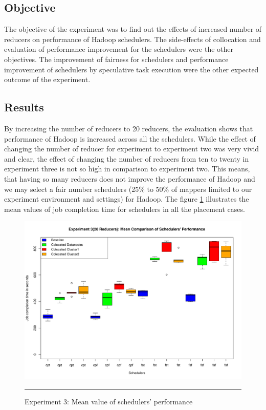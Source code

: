 \subsection{Objective}
The objective of the experiment was to find out the effects of increased number of reducers on performance of Hadoop schedulers. The side-effects of collocation and evaluation of performance improvement for the schedulers were the other objectives. The improvement of fairness for schedulers and  performance improvement of schedulers by speculative task execution were the other expected outcome of the experiment. 

\subsection{Results }
By increasing the number of reducers to 20 reducers, the evaluation shows that performance of Hadoop is increased across all the schedulers. While the effect of changing the number of reducer for experiment to experiment two was very vivid and clear, the effect of changing the number of reducers from ten to twenty in experiment three is not so high in comparison to experiment two. This means, that having so many reducers does not improve the performance of Hadoop and we may select a fair number schedulers (25\% to 50\% of mappers limited to our experiment environment and settings) for Hadoop. The figure \ref{fig:exp_3_mean} illustrates the mean values of job completion time for schedulers in all the placement cases.  


\begin{figure}[htbp]
  \centering
    \includegraphics[width=\textwidth,height=\textheight,keepaspectratio]{./Figures/exp_3_mean.pdf}
    \rule{35em}{0.5pt}
  \caption{Experiment 3: Mean value of schedulers' performance}
  \label{fig:exp_3_mean}
\end{figure}


